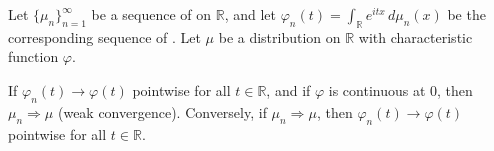 \begin{theorem} \label{theorem:levy_continuity_theorem}
Let $\{\mu_n\}_{n=1}^\infty$ be a sequence of  on $\mathbb{R}$, and let $\varphi_n(t) = \int_{\mathbb{R}} e^{itx}\, d\mu_n(x)$ be the corresponding sequence of . Let $\mu$ be a distribution on $\mathbb{R}$ with characteristic function $\varphi$.

If $\varphi_n(t) \to \varphi(t)$ pointwise for all $t \in \mathbb{R}$, and if $\varphi$ is continuous at $0$, then $\mu_n \Rightarrow \mu$ (weak convergence). Conversely, if $\mu_n \Rightarrow \mu$, then $\varphi_n(t) \to \varphi(t)$ pointwise for all $t \in \mathbb{R}$.
\end{theorem}
